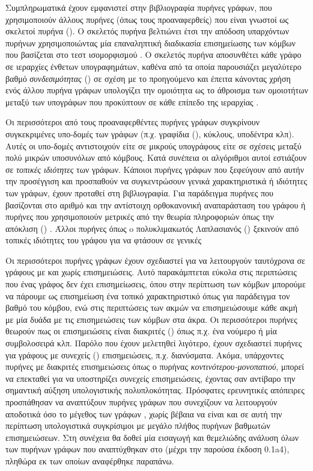 Συμπληρωματικά έχουν εμφανιστεί στην βιβλιογραφία πυρήνες γράφων, που χρησιμοποιούν άλλους πυρήνες (όπως τους προαναφερθείς) που είναι γνωστοί ως σκελετοί πυρήνα ().
Ο σκελετός πυρήνα  βελτιώνει έτσι την απόδοση υπαρχόντων πυρήνων χρησιμοποιώντας μία επαναληπτική διαδικασία επισημείωσης των κόμβων που βασίζεται στο τεστ ισομορφισμού  \cite{shervashidze2011weisfeiler}.
Ο σκελετός πυρήνα  αποσυνθέτει κάθε γράφο σε ιεραρχίες ένθετων υπογραφημάτων, καθένα από τα οποία παρουσιάζει μεγαλύτερο βαθμό \textit{συνδεσιμότητας} () σε σχέση με το προηγούμενο και έπειτα κάνοντας χρήση ενός άλλου πυρήνα γράφων υπολογίζει την ομοιότητα ως το άθροισμα των ομοιοτήτων μεταξύ των υπογράφων που προκύπτουν σε κάθε επίπεδο της ιεραρχίας \cite{nikolentzos2018}.\par
Οι περισσότεροι από τους προαναφερθέντες πυρήνες γράφων συγκρίνουν συγκεκριμένες υπο-δομές των γράφων (π.χ. γραφίδια (), κύκλους, υποδέντρα κλπ).
Αυτές οι υπο-δομές αντιστοιχούν είτε σε μικρούς υπογράφους είτε σε σχέσεις μεταξύ πολύ μικρών υποσυνόλων από κόμβους.
Κατά συνέπεια οι αλγόριθμοι αυτοί εστιάζουν σε \textit{τοπικές ιδιότητες} των γράφων.
Κάποιοι πυρήνες γράφων που ξεφεύγουν από αυτήν την προσέγγιση και προσπαθούν να συγκεντρώσουν γενικά χαρακτηριστικά ή ιδιότητες των γράφων, έχουν προταθεί στη βιβλιογραφία.
Για παράδειγμα πυρήνες που βασίζονται στο αριθμό  και την αντίστοιχη ορθοκανονική αναπαράσταση του γράφου \cite{johansson2014global} ή πυρήνες που χρησιμοποιούν μετρικές από την θεωρία πληροφοριών όπως την απόκλιση ()  \cite{Bai12}.
Άλλοι πυρήνες όπως o πολυκλιμακωτός Λαπλασιανός () ξεκινούν από τοπικές ιδιότητες του γράφου για να φτάσουν σε γενικές \cite{kondor2016multiscale}\par
Οι περισσότεροι πυρήνες γράφων έχουν σχεδιαστεί για να λειτουργούν ταυτόχρονα σε γράφους με και χωρίς επισημειώσεις.
Αυτό παρακάμπτεται εύκολα στις περιπτώσεις που ένας γράφος δεν έχει επισημείωσεις, όπου στην περίπτωση των κόμβων μπορούμε να πάρουμε ως επισημείωση ένα τοπικό χαρακτηριστικό όπως για παράδειγμα τον βαθμό του κόμβου, ενώ στις περιπτώσεις των ακμών να επισημειώσουμε κάθε ακμή με μία δυάδα με τις επισημειώσεις των κόμβων στα άκρα.
Οι περισσότεροι πυρήνες θεωρούν πως οι επισημειώσεις είναι διακριτές () όπως π.χ. ένα νούμερο ή μία συμβολοσειρά κλπ.
Παρόλο που έχουν μελετηθεί λιγότερο, έχουν σχεδιαστεί πυρήνες για γράφους με συνεχείς () επισημειώσεις, π.χ. διανύσματα.
Ακόμα, υπάρχοντες πυρήνες με διακριτές επισημειώσεις όπως ο πυρήνας \textit{κοντινότερου-μονοπατιού}, μπορεί να επεκταθεί για να υποστηρίζει συνεχείς επισημειώσεις, έχοντας σαν αντίβαρο την σημαντική αύξηση υπολογιστικής πολυπλοκότητας. 
Πρόσφατες ερευνητικές απόπειρες προσπάθησαν να αναπτύξουν πυρήνες γράφων που συνεχίζουν να λειτουργούν αποδοτικά όσο το μέγεθος των γράφων \cite{Feragen13, Orsini2015, Morris16}, χωρίς βέβαια να είναι και σε αυτή την περίπτωση υπολογιστικά συγκρίσιμοι με μεγάλο πλήθος πυρήνων βαθμωτών επισημειώσεων.
Στη συνέχεια θα δοθεί μία εισαγωγή και θεμελιώδης ανάλυση όλων των πυρήνων γράφων που αναπτύχθηκαν στο  (μέχρι την παρούσα έκδοση 0.1a4), πληθώρα εκ των οποίων αναφέρθηκε παραπάνω.
